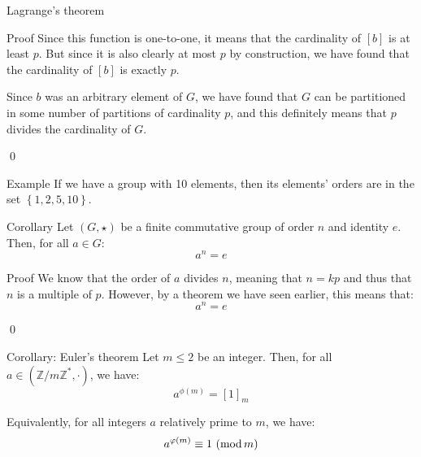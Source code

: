 \documentclass[a4paper]{article}
\begin{document}
\begin{parag}{Lagrange's theorem}
\begin{subparag}{Proof}
        Since this function is one-to-one, it means that the cardinality of $\left[b\right]$ is at least $p$. But since it is also clearly at most $p$ by construction, we have found that the cardinality of $\left[b\right]$ is exactly $p$.

        Since $b$ was an arbitrary element of $G$, we have found that $G$ can be partitioned in some number of partitions of cardinality $p$, and this definitely means that $p$ divides the cardinality of $G$.

        \qed
    \end{subparag}

    \begin{subparag}{Example}
        If we have a group with 10 elements, then its elements' orders are in the set $\left\{1, 2, 5, 10\right\}$.
    \end{subparag}
\end{parag}

\begin{parag}{Corollary}
    Let $\left(G, \star\right)$ be a finite commutative group of order $n$ and identity $e$. Then, for all $a \in G$:
    \[a^n = e\]

    \begin{subparag}{Proof}
        We know that the order of $a$ divides $n$, meaning that $n = kp$ and thus that $n$ is a multiple of $p$. However, by a theorem we have seen earlier, this means that:
        \[a^n = e\]

        \qed
    \end{subparag}
\end{parag}


\begin{parag}{Corollary: Euler's theorem}
    Let $m \leq 2$ be an integer. Then, for all $a \in \left(\mathbb{Z} / m\mathbb{Z}^*, \cdot\right)$, we have:
    \[a^{\phi\left(m\right)} = \left[1\right]_m\]

    Equivalently, for all integers $a$ relatively prime to $m$, we have:
    \[\congruent{a^{\phi\left(m\right)}}{1}{m}\]
\end{parag}
\end{document}

